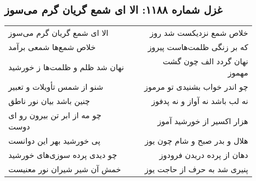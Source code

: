 \begin{center}
\section*{غزل شماره ۱۱۸۸: الا ای شمع گریان گرم می‌سوز}
\label{sec:1188}
\begin{longtable}{l p{0.5cm} r}
الا ای شمع گریان گرم می‌سوز
&&
خلاص شمع نزدیکست شد روز
\\
خلاص شمع‌ها شمعی برآمد
&&
که بر زنگی ظلمت‌هاست پیروز
\\
نهان شد ظلم و ظلمت‌ها ز خورشید
&&
نهان گردد الف چون گشت مهموز
\\
شنو از شمس تأویلات و تعبیر
&&
چو اندر خواب بشنیدی تو مرموز
\\
چنین باشد بیان نور ناطق
&&
نه لب باشد نه آواز و نه پدفوز
\\
چو مه از ابر تن بیرون رو ای دوست
&&
هزار اکسیر از خورشید آموز
\\
پی خورشید بهر این دوانست
&&
هلال و بدر صبح و شام چون یوز
\\
چو دیدی پرده سوزی‌های خورشید
&&
دهان از پرده دریدن فرودوز
\\
خمش آن شیر شیران نور معنیست
&&
پنیری شد به حرف از حاجت یوز
\\
\end{longtable}
\end{center}
